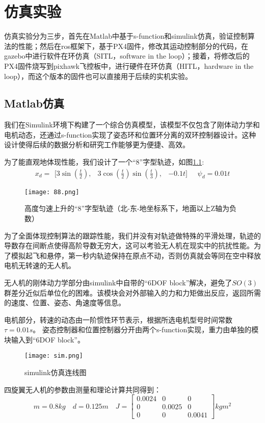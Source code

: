 \chapter{仿真实验}
仿真实验分为三步，首先在Matlab中基于s-function和simulink仿真，验证控制算法的性能；然后在ros框架下，基于PX4固件，修改其运动控制部分的代码，在gazebo中进行软件在环仿真（SITL，software in the loop）；接着，将修改后的PX4固件烧写到pixhawk飞控板中，进行硬件在环仿真（HITL，hardware in the loop），而这个版本的固件也可以直接用于后续的实机实验。
\section{Matlab仿真}
我们在Simulink环境下构建了一个综合仿真模型，该模型不仅包含了刚体动力学和电机动态，还通过s-function实现了姿态环和位置环分离的双环控制器设计。这种设计使得后续的数据分析和研究工作能够更为便捷、高效。

为了能直观地体现性能，我们设计了一个“8”字型轨迹，如图\ref{fig:8}:
$$x_d = \begin{matrix}[3\sin(\frac{t}{2}), & 3\cos(\frac{t}{2})\sin(\frac{t}{3}), &-0.1t]\end{matrix}
\quad
\psi_d=0.01t$$

\begin{figure}[!h]
  \centering
  \texttt{[image: 88.png]}
  \caption{高度匀速上升的“8”字型轨迹（北-东-地坐标系下，地面以上Z轴为负数）}
  \label{fig:8}
\end{figure}

为了全面体现控制算法的跟踪性能，我们并没有对轨迹做特殊的平滑处理，轨迹的导数存在间断点使得高阶导数无穷大，这可以考验无人机在现实中的抗扰性能。为了模拟起飞和悬停，第一秒内轨迹保持在原点不动，否则仿真就会等同在空中释放电机无转速的无人机。


  无人机的刚体动力学部分由simulink中自带的“6DOF block”解决，避免了$SO(3)$群差分近似后单位化的困难。该模块会对外部输入的力和力矩做出反应，返回所需的速度、位置、姿态、角速度等信息。

  电机部分，转速的动态由一阶惯性环节表示，根据所选电机型号时间常数$\tau=0.01s$。
  姿态控制器和位置控制器分开由两个s-function实现，重力由单独的模块输入到“6DOF block”。
  \begin{figure}[!h]
    \centering
    \texttt{[image: sim.png]}
    \caption{simulink仿真连线图}
    \label{fig:sim}
  \end{figure}

  四旋翼无人机的参数由测量和理论计算共同得到：
  $$m=0.8kg \quad d=0.125m \quad J=\begin{bmatrix}
    0.0024   &      0  &       0\\
    0 &   0.0025      &   0\\
    0  &       0   & 0.0041
  \end{bmatrix}kg m^2$$


